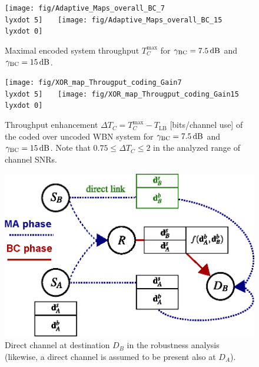 \documentclass{article}
\newcommand{\lyxdot}{.}
\begin{document}
\begin{figure}
\centering{}
\texttt{[image: fig/Adaptive\_Maps\_overall\_BC\_7\\lyxdot 5]}~~~
\texttt{[image: fig/Adaptive\_Maps\_overall\_BC\_15\\lyxdot 0]}
\caption{Maximal encoded system throughput $T_{C}^{\mathrm{max}}$ for $\gamma_{{\rm {BC}}}=7.5\,\mathrm{dB}$
and $\gamma_{{\rm {BC}}}=15\,\mathrm{dB}$.\label{fig:CTUpp_Coded_SNR_map} }
\end{figure}


\begin{figure}
\centering{}
\texttt{[image: fig/XOR\_map\_Througput\_coding\_Gain7\\lyxdot 5]}~~~
\texttt{[image: fig/XOR\_map\_Througput\_coding\_Gain15\\lyxdot 0]}
\caption{Throughput enhancement $\Delta T_{C}=T_{C}^{\mathrm{max}}-T_{\mathrm{LB}}$
[bits/channel use] of the coded over uncoded WBN system for $\gamma_{{\rm {BC}}}=7.5\,\mathrm{dB}$
and $\gamma_{{\rm {BC}}}=15\,\mathrm{dB}$. Note that $0.75\leq\Delta T_{C}\leq2$
in the analyzed range of channel SNRs.\label{fig:CTUpp_Coded_ThroughputGain}}
\end{figure}


\begin{figure}
\begin{centering}
\includegraphics[width=0.75\columnwidth]{fig/2-SRN-sc_principle_BC-TWT_directLink}
\par\end{centering}

\centering{}\caption{Direct channel at destination $D_{B}$ in the robustness analysis
(likewise, a direct channel is assumed to be present also at $D_{A}$).\label{fig:CTUpp_DirectChannel}}
\end{figure}
\end{document}
